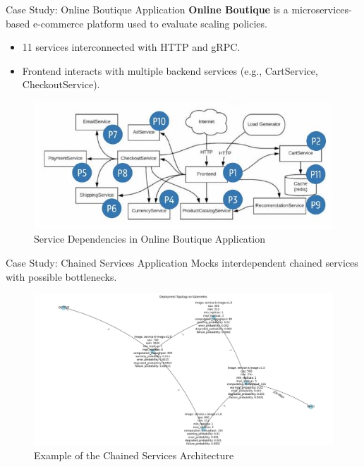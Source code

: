 \documentclass{beamer}
\begin{document}
\begin{frame}{Case Study: Online Boutique Application}
    \textbf{Online Boutique} is a microservices-based e-commerce platform used to evaluate scaling policies.
    \begin{itemize}
        \item 11 services interconnected with HTTP and gRPC.
        \item Frontend interacts with multiple backend services (e.g., CartService, CheckoutService).
    \end{itemize}
    \begin{figure}
        \includegraphics[width=\textwidth]{images/2024_11_17_21ad14b6196e5740bf69g-6.jpg} %
        \caption*{Service Dependencies in Online Boutique Application}
    \end{figure}
\end{frame}

\begin{frame}{Case Study: Chained Services Application}
    Mocks interdependent chained services with possible bottlenecks.
    \begin{figure}
        \includegraphics[width=1.1\textwidth]{images/cs_topology.png} %
        \caption*{Example of the Chained Services Architecture}
    \end{figure}
\end{frame}
\end{document}
